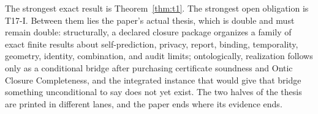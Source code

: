 The strongest exact result is Theorem~\ref{thm:t1}. The strongest open
obligation is T17-I. Between them lies the paper's actual thesis, which is
double and must remain double: structurally, a declared closure package
organizes a family of exact finite results about self-prediction, privacy,
report, binding, temporality, geometry, identity, combination, and audit
limits; ontologically, realization follows only as a conditional bridge after
purchasing certificate soundness and Ontic Closure Completeness, and the
integrated instance that would give that bridge something unconditional to
say does not yet exist. The two halves of the thesis are printed in different
lanes, and the paper ends where its evidence ends.
